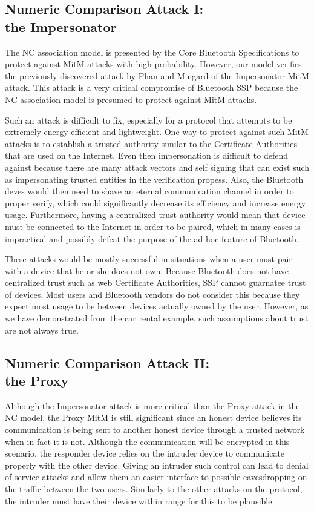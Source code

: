 \documentclass{acm_proc_article-sp}
\begin{document}
\subsection{Numeric Comparison Attack I:\\the Impersonator}
The NC association model is presented by the Core Bluetooth Specifications to protect against MitM attacks with high probability. However, our model verifies the previously discovered attack by Phan and Mingard \cite{phan:mingard} of the Impersonator MitM attack. This attack is a very critical compromise of Bluetooth SSP because the NC association model is presumed to protect against MitM attacks.

Such an attack is difficult to fix, especially for a protocol that attempts to be extremely energy efficient and lightweight. One way to protect against such MitM attacks is to establish a trusted authority similar to the Certificate Authorities that are used on the Internet. Even then impersonation is difficult to defend against because there are many attack vectors and self signing that can exist such as impersonating trusted entities in the verification propess. Also, the Bluetooth deves would then need to shave an eternal communication channel in order to proper verify, which could significantly decrease its efficiency and increase energy usage. Furthermore, having a centralized trust authority would mean that device must be connected to the Internet in order to be paired, which in many cases is impractical and possibly defeat the purpose of the ad-hoc feature of Bluetooth.

These attacks would be mostly successful in situations when a user must pair with a device that he or she does not own. Because Bluetooth does not have centralized trust such as web Certificate Authorities, SSP cannot guarnatee trust of devices. Most users and Bluetooth vendors do not consider this because they expect most usage to be between devices actually owned by the user. However, as we have demonstrated from the car rental example, such assumptions about trust are not always true.

\subsection{Numeric Comparison Attack II:\\the Proxy}
Although the Impersonator attack is more critical than the Proxy attack in the NC model, the Proxy MitM is still significant since an honest device believes its communication is being sent to another honest device through a trusted network when in fact it is not. Although the communication will be encrypted in this scenario, the responder device relies on the intruder device to communicate properly with the other device. Giving an intruder such control can lead to denial of service attacks and allow them an easier interface to possible eavesdropping on the traffic between the two users. Similarly to the other attacks on the protocol, the intruder must have their device within range for this to be plausible.
\end{document}

